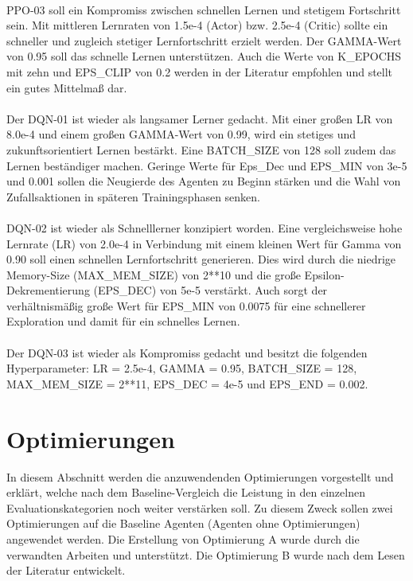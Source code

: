 \\PPO-03 soll ein Kompromiss zwischen schnellen Lernen und stetigem Fortschritt sein. Mit mittleren Lernraten von 1.5e-4 (Actor) bzw. 2.5e-4 (Critic) sollte ein schneller und zugleich stetiger Lernfortschritt erzielt werden. Der GAMMA-Wert von 0.95 soll das schnelle Lernen unterstützen. Auch die Werte von K\_EPOCHS mit zehn und EPS\_CLIP von 0.2 werden in der Literatur \cite[Anhang A]{PPO} empfohlen und stellt ein gutes Mittelmaß dar.\\
\\Der DQN-01 ist wieder als langsamer Lerner gedacht. Mit einer großen LR von 8.0e-4 und einem großen GAMMA-Wert von 0.99, wird ein stetiges und zukunftsorientiert Lernen bestärkt. Eine BATCH\_SIZE von 128 soll zudem das Lernen beständiger machen. Geringe Werte für Eps\_Dec und EPS\_MIN von 3e-5 und 0.001 sollen die Neugierde des Agenten zu Beginn stärken und die Wahl von Zufallsaktionen in späteren Trainingsphasen senken.\\
\\DQN-02 ist wieder als Schnelllerner konzipiert worden. Eine vergleichsweise hohe Lernrate (LR) von 2.0e-4 in Verbindung mit einem kleinen Wert für Gamma von 0.90 soll einen schnellen Lernfortschritt generieren. Dies wird durch die niedrige Memory-Size (MAX\_MEM\_SIZE) von 2**10 und die große Epsilon-Dekrementierung (EPS\_DEC) von 5e-5 verstärkt. Auch sorgt der verhältnismäßig große Wert für EPS\_MIN von 0.0075 für eine schnellerer Exploration und damit für ein schnelles Lernen.\\
\\Der DQN-03 ist wieder als Kompromiss gedacht und besitzt die folgenden Hyperparameter: 
LR = 2.5e-4, GAMMA = 0.95, BATCH\_SIZE = 128, 
MAX\_MEM\_SIZE = 2**11, EPS\_DEC = 4e-5 und EPS\_END = 0.002.

\section{Optimierungen}
In diesem Abschnitt werden die anzuwendenden Optimierungen vorgestellt und erklärt, welche nach dem Baseline-Vergleich die Leistung in den einzelnen Evaluationskategorien noch weiter verstärken soll. Zu diesem Zweck sollen zwei Optimierungen auf die Baseline Agenten (Agenten ohne Optimierungen) angewendet werden. Die Erstellung von Optimierung A wurde durch die verwandten Arbeiten \cite{UAV} und \cite{Autonomous_Agents_in_Snake_Game_via_DRL} unterstützt. Die Optimierung B wurde nach dem Lesen der Literatur \cite[S. 331 f.]{DRL_Lapan} entwickelt.\\

